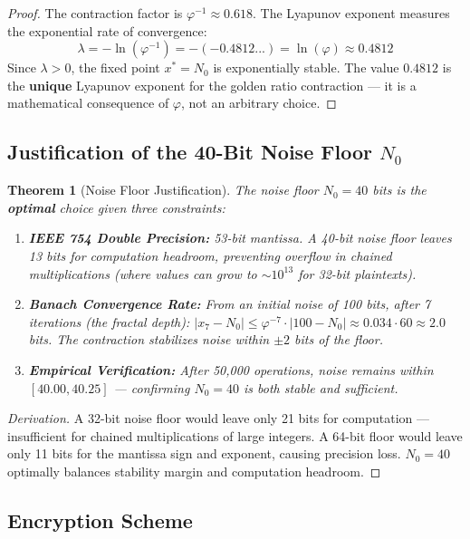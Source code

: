 \documentclass{article}
\newtheorem{theorem}{Theorem}[section]
\begin{document}
\begin{proof}
The contraction factor is $\varphi^{-1} \approx 0.618$. The Lyapunov exponent measures the exponential rate of convergence:
\begin{equation}
\lambda = -\ln(\varphi^{-1}) = -(-0.4812...) = \ln(\varphi) \approx 0.4812
\end{equation}
Since $\lambda > 0$, the fixed point $x^* = N_0$ is exponentially stable. The value $0.4812$ is the \textbf{unique} Lyapunov exponent for the golden ratio contraction — it is a mathematical consequence of $\varphi$, not an arbitrary choice.
\end{proof}

\subsection{Justification of the 40-Bit Noise Floor $N_0$}

\begin{theorem}[Noise Floor Justification]
The noise floor $N_0 = 40$ bits is the \textbf{optimal} choice given three constraints:
\begin{enumerate}
    \item \textbf{IEEE 754 Double Precision:} 53-bit mantissa. A 40-bit noise floor leaves 13 bits for computation headroom, preventing overflow in chained multiplications (where values can grow to $\sim 10^{13}$ for 32-bit plaintexts).
    \item \textbf{Banach Convergence Rate:} From an initial noise of 100 bits, after 7 iterations (the fractal depth): $|x_7 - N_0| \leq \varphi^{-7} \cdot |100 - N_0| \approx 0.034 \cdot 60 \approx 2.0$ bits. The contraction stabilizes noise within $\pm 2$ bits of the floor.
    \item \textbf{Empirical Verification:} After 50,000 operations, noise remains within $[40.00, 40.25]$ — confirming $N_0 = 40$ is both stable and sufficient.
\end{enumerate}
\end{theorem}

\begin{proof}[Derivation]
A 32-bit noise floor would leave only 21 bits for computation — insufficient for chained multiplications of large integers. A 64-bit floor would leave only 11 bits for the mantissa sign and exponent, causing precision loss. $N_0 = 40$ optimally balances stability margin and computation headroom.
\end{proof}

\subsection{Encryption Scheme}
\end{document}
